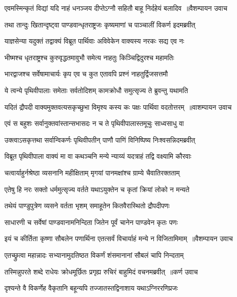 \twolineshloka
{एवमस्मिन्कृतं विद्यां यदि नाहं धनञ्जय}
{दीप्तेऽग्नौ सहितौ बाहू निर्दहेयं बलादिव ॥वैशम्पायन उवाच}


\twolineshloka
{तथा तान्दुः खितान्दृष्ट्वा पाण्डवान्धृतराष्ट्रजः}
{कृष्यमाणां च पाञ्चालीं विकर्ण इदमब्रवीत्}


\twolineshloka
{याज्ञसेन्या यदुक्तं तद्वाक्यं विब्रूत पार्थिवाः}
{अविवेकेन वाक्यस्य नरकः सद्य एव नः}


\twolineshloka
{भीष्मश्च धृतराष्ट्रश्च कुरुवृद्धतमावुभौ}
{समेत्य नाहतुः किञ्चिद्विदुरश्च महामतिः}


\twolineshloka
{भारद्वाजश्च सर्वेषामाचार्यः कृप एव च}
{कुत एतावपि प्रश्नं नाहतुर्द्विजसत्तमौ}


\twolineshloka
{ये त्वन्ये पृथिवीपालाः समेताः सर्वतोदिशम्}
{कामक्रोधौ समुत्सृज्य ते ब्रुवन्तु यथामति}


\twolineshloka
{यदितं द्रौपदी वाक्यमुक्तवत्यसकृच्छुभा}
{विमृश्य कस्य कः पक्षः पार्थिवा वदतोत्तरम् ॥वाशम्पायन उवाच}


\twolineshloka
{एवं स बहुशः सर्वानुक्तवांस्तान्सभासदः}
{न च ते पृथिवीपालास्तमूचुः साध्वसाधु वा}


\twolineshloka
{उक्त्वाऽसकृत्तथा सर्वान्विकर्णः पृथिवीपतीन्}
{पाणौ पाणिं विनिष्पिष्य निःश्वसन्निदमब्रवीत्}


\twolineshloka
{विब्रूत पृथिवीपाला वाक्यं मा वा कथञ्चनि}
{मन्ये न्याय्यं यदत्राहं तद्वि वक्ष्यामि कौरवाः}


\twolineshloka
{चत्वार्याहुर्नश्रेष्ठा व्यसनानि महीक्षिताम्}
{मृगयां पानमक्षांश्च ग्राम्ये चैवातिरक्तताम्}


\twolineshloka
{एतेषु हि नरः सक्तो धर्ममुत्सृज्य वर्तते}
{यथाऽयुक्तेन च कृतां क्रियां लोको न मन्यते}


\twolineshloka
{तथेयं पाण्डुपुत्रेण व्यसने वर्तता भृशम्}
{समाहूतेन कितवैरास्थितो द्रौपदीपणः}


\twolineshloka
{साधारणी च सर्वेषां पाण्डवानामनिन्दिता}
{जितेन पूर्वं चानेन पाण्डवेन कृतः पणः}


\twolineshloka
{इयं च कीर्तिता कृष्णा सौबलेन पणार्थिना}
{एतत्सर्वं विचार्याहं मन्ये न विजितामिमाम् ॥वैशम्पायन उवाच}


\twolineshloka
{एतच्छ्रुत्वा महान्नादः सभ्यानामुदतिष्ठत}
{विकर्णं शंसमानानां सौबलं चापि निन्दताम्}


\twolineshloka
{तस्मिन्नुपरते शब्दे राधेयः क्रोधमूर्छितः}
{प्रगृह्य रुचिरं बाहुमिदं वचनमब्रवीत् ॥कर्ण उवाच}


\twolineshloka
{दृश्यन्ते वै विकर्णेह वैकृतानि बहून्यपि}
{तज्जातस्तद्विनाशाय यथाऽग्निररणिप्रजः}



